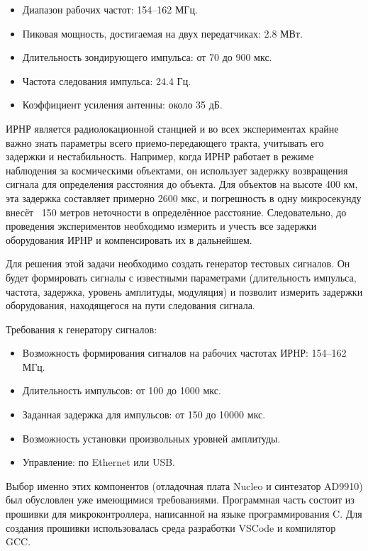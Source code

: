 \documentclass[rusmathsym, eqnumwithinsec, amspack, hyperref]{bomgost}
\begin{document}
\begin{itemize}
	\item Диапазон рабочих частот: 154–162 МГц.
	\item Пиковая мощность, достигаемая на двух передатчиках: 2.8 МВт.
	\item Длительность зондирующего импульса: от 70 до 900 мкс.
	\item Частота следования импульса: 24.4 Гц.
	\item Коэффициент усиления антенны: около 35 дБ.
\end{itemize}

ИРНР является радиолокационной станцией и во всех экспериментах крайне важно знать параметры всего приемо-передающего тракта, учитывать его задержки и нестабильность. Например, когда ИРНР работает в режиме наблюдения за космическими объектами, он использует задержку возвращения сигнала для определения расстояния до объекта. Для объектов на высоте 400 км, эта задержка составляет примерно 2600 мкс, и погрешность в одну микросекунду внесёт ~150 метров неточности в определённое расстояние. Следовательно, до проведения экспериментов необходимо измерить и учесть все задержки оборудования ИРНР и компенсировать их в дальнейшем.

Для решения этой задачи необходимо создать генератор тестовых сигналов. Он будет формировать сигналы с известными параметрами (длительность импульса, частота, задержка, уровень амплитуды, модуляция) и позволит измерить задержки оборудования, находящегося на пути следования сигнала.

Требования к генератору сигналов:

\begin{itemize}
	\item Возможность формирования сигналов на рабочих частотах ИРНР: 154–162 МГц.
	\item Длительность импульсов: от 100 до 1000 мкс.
	\item Заданная задержка для импульсов: от 150 до 10000 мкс.
	\item Возможность установки произвольных уровней амплитуды.
	\item Управление: по Ethernet или USB.
\end{itemize}

Выбор именно этих компонентов (отладочная плата Nucleo и синтезатор AD9910) был обусловлен уже имеющимися требованиями. Программная часть состоит из прошивки для микроконтроллера, написанной на языке программирования C. Для создания прошивки использовалась среда разработки VSCode и компилятор GCC.
\end{document}
